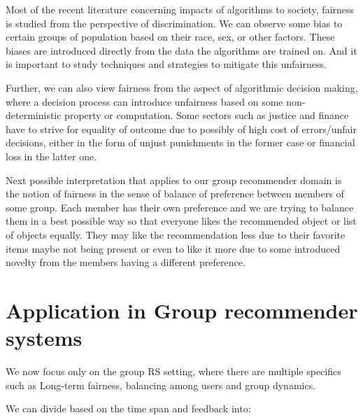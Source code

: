 Most of the recent literature concerning impacts of algorithms to society, fairness is studied from the perspective of discrimination. We can observe some bias to certain groups of population based on their race, sex, or other factors. These biases are introduced directly from the data the algorithms are trained on. And it is important to study techniques and strategies to mitigate this unfairness.

Further, we can also view fairness from the aspect of algorithmic decision making, where a decision process can introduce unfairness based on some non-deterministic property or computation. Some sectors such as justice and finance have to strive for equality of outcome due to possibly of high cost of errors/unfair decisions, either in the form of unjust punishments in the former case or financial loss in the latter one.

Next possible interpretation that applies to our group recommender domain is the notion of fairness in the sense of balance of preference between members of some group. Each member has their own preference and we are trying to balance them in a best possible way so that everyone likes the recommended object or list of objects equally. They may like the recommendation less due to their favorite items maybe not being present or even to like it more due to some introduced novelty from the members having a different preference.





\section{Application in Group recommender systems} \label{sec:02_application_in_grs}


We now focus only on the group RS setting, where there are multiple specifics such as Long-term fairness, balancing among users and group dynamics.

We can divide based on the time span and feedback into:

